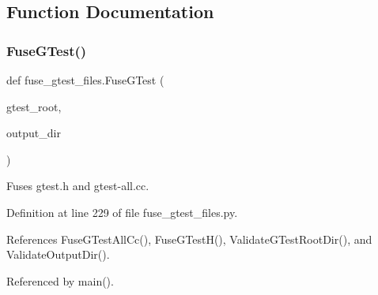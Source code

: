 \subsection{Function Documentation}
\mbox{\label{namespacefuse__gtest__files_a4e7007ceec3a7a25617eac3342563ed6}} 
\subsubsection{\texorpdfstring{Fuse\+G\+Test()}{FuseGTest()}}
{\footnotesize\ttfamily def fuse\+\_\+gtest\+\_\+files.\+Fuse\+G\+Test (\begin{DoxyParamCaption}\item[{}]{gtest\+\_\+root,  }\item[{}]{output\+\_\+dir }\end{DoxyParamCaption})}

\begin{DoxyVerb}Fuses gtest.h and gtest-all.cc.\end{DoxyVerb}
 

Definition at line 229 of file fuse\+\_\+gtest\+\_\+files.\+py.



References Fuse\+G\+Test\+All\+Cc(), Fuse\+G\+Test\+H(), Validate\+G\+Test\+Root\+Dir(), and Validate\+Output\+Dir().



Referenced by main().



